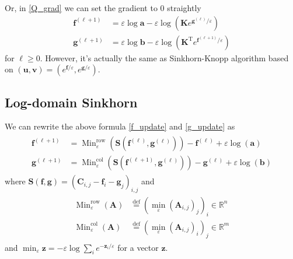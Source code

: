 \documentclass{article}
\begin{document}
Or, in \ref{Q_grad} we can set the gradient to 0 straightly
\begin{align}
\mathbf { f } ^ { ( \ell + 1 ) } &= \varepsilon \log \mathbf { a } - \varepsilon \log \left( \mathbf { K } e ^ { \mathbf { g } ^ { ( \ell ) } / \varepsilon } \right)\label{f_update}\\
\mathbf { g } ^ { ( \ell + 1 ) } &= \varepsilon \log \mathbf { b } - \varepsilon \log \left( \mathbf { K } ^ { \mathrm { T } } e ^ { \mathbf { f } ^ { ( \ell + 1 ) } / \varepsilon } \right)
\label{g_update}
\end{align}
for $\ell \ge0$. However, it's actually the same as Sinkhorn-Knopp algorithm based on $( \mathbf { u } , \mathbf { v } ) = \left( e ^ { \mathbf { f } / \varepsilon } , e ^ { \mathbf { g } / \varepsilon } \right)$.

\subsection{Log-domain Sinkhorn}
We can rewrite the above formula \ref{f_update} and \ref{g_update} as
\begin{align}
\begin{aligned} \mathbf { f } ^ { ( \ell + 1 ) } & = \operatorname { Min } _ { \varepsilon } ^ { \mathrm { row } } \left( \mathbf { S } \left( \mathbf { f } ^ { ( \ell ) } , \mathbf { g } ^ { ( \ell ) } \right) \right) - \mathbf { f } ^ { ( \ell ) } + \varepsilon \log ( \mathbf { a } ) \\ \mathbf { g } ^ { ( \ell + 1 ) } & = \operatorname { Min } _ { \varepsilon } ^ { \mathrm { col } } \left( \mathbf { S } \left( \mathbf { f } ^ { ( \ell + 1 ) } , \mathbf { g } ^ { ( \ell ) } \right) \right) - \mathbf { g } ^ { ( \ell ) } + \varepsilon \log ( \mathbf { b } ) \end{aligned}
\label{log update}
\end{align}
where $\mathbf { S } ( \mathbf { f } , \mathbf { g } ) = \left( \mathbf { C } _ { i , j } - \mathbf { f } _ { i } - \mathbf { g } _ { j } \right) _ { i , j }$ and
\begin{align}
\begin{aligned} \operatorname { Min } _ { \varepsilon } ^ { \mathrm { row } } ( \mathbf { A } ) &\stackrel { \mathrm { def } } { = } \left( \min _ { \varepsilon } \left( \mathbf { A } _ { i , j } \right) _ { j } \right) _ { i }  \in \mathbb { R } ^ { n } \\ \operatorname { Min } _ { \varepsilon } ^ { \mathrm { col } } ( \mathbf { A } ) &\stackrel { \mathrm { def} } { = }  \left( \min _ { \varepsilon } \left( \mathbf { A } _ { i , j } \right) _ { i } \right) _ { j } \in \mathbb { R } ^ { m } \end{aligned}
\end{align}
and $\min _ { \varepsilon } \mathbf { z } = - \varepsilon \log \sum _ { i } e ^ { - \mathbf { z } _ { i } / \varepsilon }$ for a vector $\mathbf{z}$.
\end{document}
